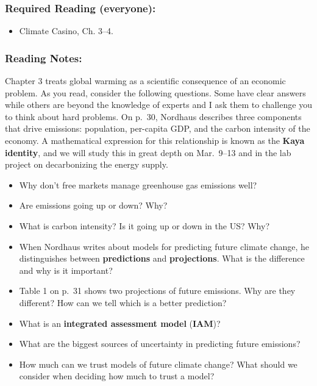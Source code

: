 \documentclass[
]{article}
\providecommand{\tightlist}{%
  \setlength{\itemsep}{0pt}\setlength{\parskip}{0pt}}
\newcommand{\COO}{\ce{CO2}}
\begin{document}
\hypertarget{required-reading-everyone-12}{%
\subsubsection{Required Reading
(everyone):}\label{required-reading-everyone-12}}

\begin{itemize}
\tightlist
\item
  Climate Casino, Ch. 3--4.
\end{itemize}

\hypertarget{reading-notes-12}{%
\subsubsection{Reading Notes:}\label{reading-notes-12}}

Chapter 3 treats global warming as a scientific consequence of an
economic problem. As you read, consider the following questions. Some
have clear answers while others are beyond the knowledge of experts and
I ask them to challenge you to think about hard problems. On p.~30,
Nordhaus describes three components that drive \COO{} emissions:
population, per-capita GDP, and the carbon intensity of the economy. A
mathematical expression for this relationship is known as the
\textbf{Kaya identity}, and we will study this in great depth on
Mar.~9--13 and in the lab project on decarbonizing the energy supply.

\begin{itemize}
\tightlist
\item
  Why don't free markets manage greenhouse gas emissions well?
\item
  Are \COO{} emissions going up or down? Why?
\item
  What is carbon intensity? Is it going up or down in the US? Why?
\item
  When Nordhaus writes about models for predicting future climate
  change, he distinguishes between \textbf{predictions} and
  \textbf{projections}. What is the difference and why is it important?
\item
  Table 1 on p.~31 shows two projections of future \COO{} emissions. Why
  are they different? How can we tell which is a better prediction?
\item
  What is an \textbf{integrated assessment model} (\textbf{IAM})?
\item
  What are the biggest sources of uncertainty in predicting future
  \COO{} emissions?
\item
  How much can we trust models of future climate change? What should we
  consider when deciding how much to trust a model?
\end{itemize}
\end{document}
